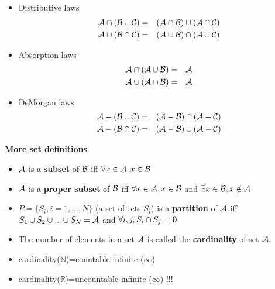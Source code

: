 \documentclass[justified, sixbynine]{tufte-book}
\def\subsubsection#1{{\bf #1}}
\theoremstyle{plain}%
\newtheorem * {corollary}{Corollary}
\theoremstyle{definition}
\theoremstyle{remark}
\newtheorem * {remark}{Remark}
\newtheorem * {note}{Note}
\begin{document}
\begin{fullwidth}
\begin{itemize}
\item  Distributive laws
\begin{eqnarray}
{\cal A}\cap ({\cal B}\cup {\cal C}) &=&({\cal A}\cap {\cal B})\cup ({\cal A}%
\cap {\cal C}) \\
{\cal A}\cup ({\cal B}\cap {\cal C}) &=&({\cal A}\cup {\cal B})\cap ({\cal A}%
\cup {\cal C})
\end{eqnarray}

\item  Absorption laws
\begin{eqnarray}
{\cal A}\cap ({\cal A}\cup {\cal B}) &=&{\cal A} \\
{\cal A}\cup ({\cal A}\cap {\cal B}) &=&{\cal A}
\end{eqnarray}

\item  DeMorgan laws
\begin{eqnarray}
{\cal A}-({\cal B}\cup {\cal C}) &=&({\cal A}-{\cal B})\cap ({\cal A}-{\cal C%
}) \\
{\cal A}-({\cal B}\cap {\cal C}) &=&({\cal A}-{\cal B})\cup ({\cal A}-{\cal C%
})
\end{eqnarray}
\end{itemize}

\subsubsection{More set definitions}

\begin{itemize}
\item  ${\cal A}$ is a {\bf subset} of ${\cal B}$ iff $\forall x\in {\cal A}%
, x\in {\cal B}$

\item  ${\cal A}$ is a {\bf proper subset} of ${\cal B}$ iff $\forall x\in
{\cal A}, x\in {\cal B}$ and $\exists x\in {\cal B}, x\notin {\cal A}$

\item  $P=\{S_i, i=1, ..., N\}$ (a set of sets $S_i$) is a {\bf partition} of $%
{\cal A}$ iff $S_1\cup S_2\cup ...\cup S_N={\cal A}$ and $\forall
i, j, S_i\cap S_j={\bf 0}$

\item  The number of elements in a set ${\cal A}$ is called the {\bf %
cardinality} of set ${\cal A}.$

\item  cardinality($\mathbb{N}$)=countable infinite ($\infty $)

\item  cardinality($\mathbb{R}$)=uncountable infinite ($\infty $) !!!
\end{itemize}



\end{fullwidth}
\end{document}
